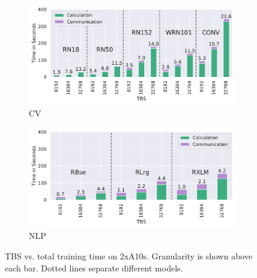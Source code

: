 \begin{figure}
    \begin{subfigure}[c]{0.23\textwidth}
        \includegraphics[width=\textwidth]{figures/misc/cv_2xa10_all-tbs_granularity}
        \vspace{-18pt}
        \caption{CV}
        \label{fig:cv-2xa10-granulartiy}
    \end{subfigure}
    \begin{subfigure}[c]{0.23\textwidth}
        \includegraphics[width=\textwidth]{figures/misc/nlp_2xa10_all-tbs_granularity}
        \vspace{-18pt}
        \caption{NLP} 
        \label{fig:nlp-2xa10-granularity}
    \end{subfigure}
    \vspace{-10pt}
    \caption{TBS vs. total training time on 2xA10s. Granularity is shown above each bar. Dotted lines separate different models.}
    \label{fig:2xa10-granulartiy}
\end{figure}

